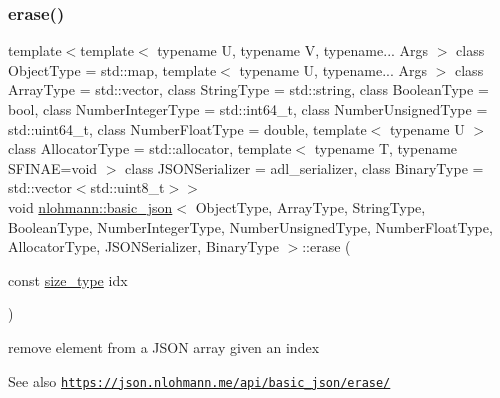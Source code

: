 \subsubsection{\texorpdfstring{erase()}{erase()}\hspace{0.1cm}{\footnotesize\ttfamily [4/4]}}
{\footnotesize\ttfamily template$<$template$<$ typename U, typename V, typename... Args $>$ class Object\+Type = std\+::map, template$<$ typename U, typename... Args $>$ class Array\+Type = std\+::vector, class String\+Type  = std\+::string, class Boolean\+Type  = bool, class Number\+Integer\+Type  = std\+::int64\+\_\+t, class Number\+Unsigned\+Type  = std\+::uint64\+\_\+t, class Number\+Float\+Type  = double, template$<$ typename U $>$ class Allocator\+Type = std\+::allocator, template$<$ typename T, typename S\+F\+I\+N\+A\+E=void $>$ class J\+S\+O\+N\+Serializer = adl\+\_\+serializer, class Binary\+Type  = std\+::vector$<$std\+::uint8\+\_\+t$>$$>$ \\
void \hyperlink{classnlohmann_1_1basic__json}{nlohmann\+::basic\+\_\+json}$<$ Object\+Type, Array\+Type, String\+Type, Boolean\+Type, Number\+Integer\+Type, Number\+Unsigned\+Type, Number\+Float\+Type, Allocator\+Type, J\+S\+O\+N\+Serializer, Binary\+Type $>$\+::erase (\begin{DoxyParamCaption}\item[{const \hyperlink{classnlohmann_1_1basic__json_a3ada29bca70b4965f6fd37ec1c8f85f7}{size\+\_\+type}}]{idx }\end{DoxyParamCaption})\hspace{0.3cm}{\ttfamily [inline]}}



remove element from a J\+S\+ON array given an index 

\begin{DoxySeeAlso}{See also}
\href{https://json.nlohmann.me/api/basic_json/erase/}{\tt https\+://json.\+nlohmann.\+me/api/basic\+\_\+json/erase/} 
\end{DoxySeeAlso}
\mbox{\label{classnlohmann_1_1basic__json_acdf9b3aab82dcf443dd91ca5ec06b80c}} 
